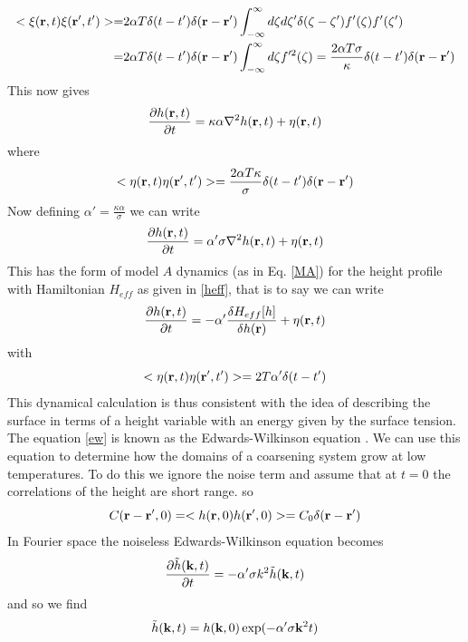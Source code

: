 \begin{align}
< \xi({\bf r},t)\xi({\bf r}',t')> =&2\alpha T\delta(t-t')\delta({\bf r}-{\bf r}')\int_{-\infty}^\infty d\zeta d\zeta' \delta(\zeta-\zeta')f'(\zeta)f'(\zeta')\nonumber \\
=& 2\alpha T\delta(t-t')\delta({\bf r}-{\bf r}')\int_{-\infty}^\infty d\zeta f'^2(\zeta)= \frac{2\alpha T\sigma}{\kappa}\delta(t-t')\delta({\bf r}-{\bf r}')
\end{align}
This now gives
\begin{equation}
\frac{\partial h({\bf r},t)}{\partial t}= \kappa\alpha \nabla^2 h({\bf r},t) + \eta({\bf r},t)
\end{equation}
where 
\begin{equation}
< \eta({\bf r},t)\eta({\bf r}',t')> = \frac{2\alpha T\kappa}{\sigma}\delta(t-t')\delta({\bf r}-{\bf r}')
\end{equation}
Now defining $\alpha' = \frac{\kappa\alpha}{\sigma}$ we can write
\begin{equation}
\frac{\partial h({\bf r},t)}{\partial t}= \alpha' \sigma\nabla^2 h({\bf r},t) + \eta({\bf r},t)
\end{equation}
This has the form of model $A$ dynamics (as in Eq. \eqref{MA}) for the height profile with Hamiltonian
$H_{eff}$ as given in \eqref{heff}, that is to say we can write
\begin{equation}
\frac{\partial h({\bf r},t)}{\partial t}= -\alpha' \frac{\delta H_{eff}[h]}{\delta h({\bf r})} + \eta({\bf r},t)
\label{ew}
\end{equation}
with
\begin{equation}
< \eta({\bf r},t)\eta({\bf r}',t')>= 2T\alpha'\delta(t-t')
\end{equation}
This dynamical calculation is thus consistent with the idea of describing the surface in terms of a height variable with an energy given by the surface tension. The equation \eqref{ew} is known as the Edwards-Wilkinson equation \cite{edwards_surface_1982,halpin-healy_kinetic_1995}. We can use this equation to determine how the domains of a coarsening system grow at low temperatures. To do this we ignore the noise term and assume that at $t=0$ the correlations of the height are short range. so
\begin{equation}
C({\bf r}-{\bf r}',0)= < h({\bf r},0)h({\bf r}',0)> =C_0 \delta({\bf r}-{\bf r}')
\end{equation}
In Fourier space the noiseless Edwards-Wilkinson equation becomes
\begin{equation}
\frac{\partial\tilde h({\bf k},t)}{\partial t} = -\alpha'\sigma k^2\tilde h({\bf k},t) 
\end{equation}
and so we find
\begin{equation}
\tilde h({\bf k},t) = h({\bf k},0)\exp(-\alpha'\sigma{\bf k}^2 t)
\end{equation}
